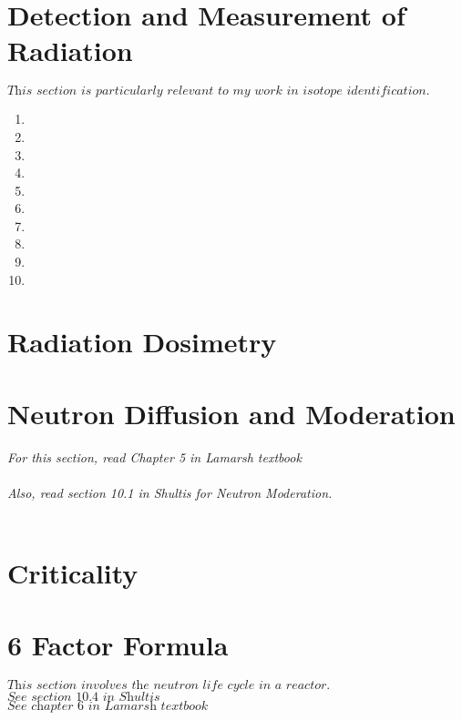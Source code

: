 \documentclass{article}
\begin{document}
\section{Detection and Measurement of Radiation}
$\textit{This section is particularly relevant to my work in isotope identification.}$\\

\begin{enumerate}
	\item{}
	\item{}
	\item{}
	\item{}
	\item{}
	\item{}
	\item{}
	\item{}
	\item{}
	\item{}
\end{enumerate}

\section{Radiation Dosimetry}

\section{Neutron Diffusion and Moderation}
\textit{For this section, read Chapter 5 in Lamarsh textbook}\\\\
\textit{Also, read section 10.1 in Shultis for Neutron Moderation.}\\\\

\section{Criticality}

\section{6 Factor Formula}
$\textit{This section involves the neutron life cycle in a reactor.}$\\
$\textit{See section 10.4 in Shultis}$\\
$\textit{See chapter 6 in Lamarsh textbook}$\\
\end{document}
